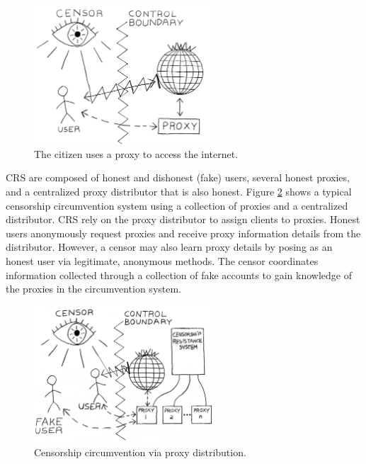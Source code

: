 \begin{figure}[h!]
\centering
     \includegraphics[width=0.6\textwidth]{fig/censor_block_new1.png}
    \caption{The citizen uses a proxy to access the internet.}
    
    \label{fig:censorblock}
\end{figure}

\ac{CRS} are composed of honest and dishonest (fake) users, several honest proxies, and a centralized proxy distributor that is also honest. Figure \ref{fig:proxydistro} shows a typical censorship circumvention system using a collection of proxies and a centralized distributor. \ac{CRS} rely on the proxy distributor to assign clients to proxies. Honest users anonymously request proxies and receive proxy information details from the distributor. However, a censor may also learn proxy details by posing as an honest user via legitimate, anonymous methods. The censor coordinates information collected through a collection of fake accounts to gain knowledge of the proxies in the circumvention system.

\begin{figure}[h!]
\centering
     \includegraphics[width=0.6\textwidth]{fig/censor_crs_new.png}
    \caption{Censorship circumvention via proxy distribution.}
    \label{fig:proxydistro}
\end{figure}

